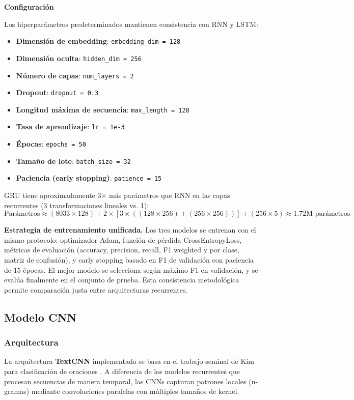 \documentclass[paper=letter, fontsize=11pt, draft=false]{scrartcl}
\numberwithin{equation}{section} %
\numberwithin{figure}{section} %
\numberwithin{table}{section} %
\numberwithin{subsection}{section}
\begin{document}
\textbf{Configuración}

Los hiperparámetros predeterminados mantienen consistencia con RNN y LSTM:
\begin{itemize}
    \item \textbf{Dimensión de embedding}: \texttt{embedding\_dim = 128}
    \item \textbf{Dimensión oculta}: \texttt{hidden\_dim = 256}
    \item \textbf{Número de capas}: \texttt{num\_layers = 2}
    \item \textbf{Dropout}: \texttt{dropout = 0.3}
    \item \textbf{Longitud máxima de secuencia}: \texttt{max\_length = 128}
    \item \textbf{Tasa de aprendizaje}: \texttt{lr = 1e-3}
    \item \textbf{Épocas}: \texttt{epochs = 50}
    \item \textbf{Tamaño de lote}: \texttt{batch\_size = 32}
    \item \textbf{Paciencia (early stopping)}: \texttt{patience = 15}
\end{itemize}

GRU tiene aproximadamente 3× más parámetros que RNN en las capas recurrentes (3 transformaciones lineales vs. 1):
\[
\text{Parámetros} \approx (8033 \times 128) + 2 \times [3 \times ((128 \times 256) + (256 \times 256))] + (256 \times 5) \approx 1.72 \text{M parámetros}
\]

\textbf{Estrategia de entrenamiento unificada.} Los tres modelos se entrenan con el mismo protocolo: optimizador Adam, función de pérdida CrossEntropyLoss, métricas de evaluación (accuracy, precision, recall, F1 weighted y por clase, matriz de confusión), y early stopping basado en F1 de validación con paciencia de 15 épocas. El mejor modelo se selecciona según máximo F1 en validación, y se evalúa finalmente en el conjunto de prueba. Esta consistencia metodológica permite comparación justa entre arquitecturas recurrentes.

\newpage
\subsection{Modelo CNN}

\subsubsection{Arquitectura}

La arquitectura \textbf{TextCNN} implementada se basa en el trabajo seminal de Kim para clasificación de oraciones \cite{kim2014convolutional}. A diferencia de los modelos recurrentes que procesan secuencias de manera temporal, las CNNs capturan patrones locales (n-gramas) mediante convoluciones paralelas con múltiples tamaños de kernel.
\end{document}
